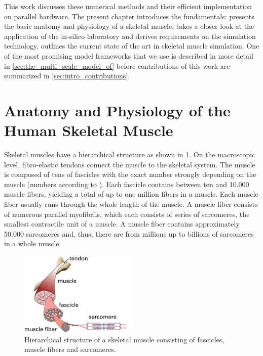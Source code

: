 This work discusses these numerical methods and their efficient implementation on parallel hardware. The present chapter introduces the fundamentals:
 presents the basic anatomy and physiology of a skeletal muscle.
 takes a closer look at the application of the in-silico laboratory and derives requirements on the simulation technology. 
 outlines the current state of the art in skeletal muscle simulation. One of the most promising model frameworks that we use is described in more detail in \cref{sec:the_multi_scale_model_of} before contributions of this work are summarized in \cref{sec:intro_contributions}.

\section{Anatomy and Physiology of the Human Skeletal Muscle}\label{sec:anatomy_physiology}

Skeletal muscles have a hierarchical structure as shown in \cref{fig:hierarchical_structure}. On the macroscopic level, fibro-elastic tendons connect the muscle to the skeletal system. The muscle is composed of tens of fascicles with the exact number strongly depending on the muscle (numbers according to \cite{MacIntosh2006}). Each fascicle contains between ten and 10.000 muscle fibers, yielding a total of up to one million fibers in a muscle. Each muscle fiber usually runs through the whole length of the muscle. A muscle fiber consists of numerous parallel myofibrils, which each consists of series of sarcomeres, the smallest contractile unit of a muscle. A muscle fiber contains approximately 50.000 sarcomeres and, thus, there are from millions up to billions of sarcomeres in a whole muscle.

\begin{figure}
  \centering%
  \includegraphics[width=0.5\textwidth]{images/introduction/hierarchical_structure.pdf}%
  \caption{Hierarchical structure of a skeletal muscle consisting of fascicles, muscle fibers and sarcomeres.}%
  \label{fig:hierarchical_structure}%
\end{figure}%

